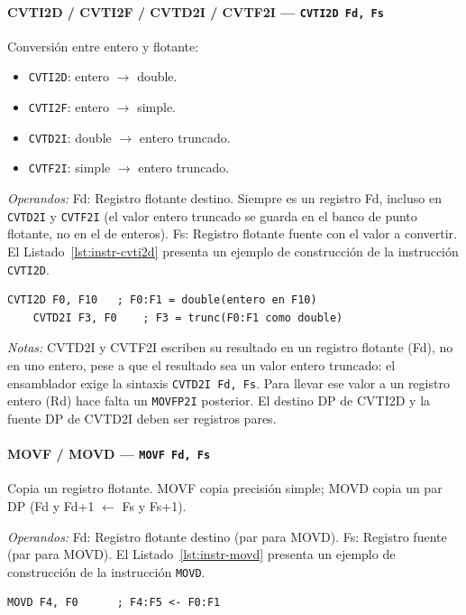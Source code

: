 \documentclass[../main.tex]{subfiles}
\begin{document}
\paragraph*{CVTI2D / CVTI2F / CVTD2I / CVTF2I --- \texttt{CVTI2D Fd, Fs}}
Conversión entre entero y flotante:
\begin{itemize}
	\item \texttt{CVTI2D}: entero $\to$ double.
	\item \texttt{CVTI2F}: entero $\to$ simple.
	\item \texttt{CVTD2I}: double $\to$ entero truncado.
	\item \texttt{CVTF2I}: simple $\to$ entero truncado.
\end{itemize}

\textit{Operandos:} Fd: Registro flotante destino. Siempre es un registro Fd, incluso en \texttt{CVTD2I} y \texttt{CVTF2I} (el valor entero truncado se guarda en el banco de punto flotante, no en el de enteros). Fs: Registro flotante fuente con el valor a convertir.
El Listado~\ref{lst:instr-cvti2d} presenta un ejemplo de construcción de la instrucción \texttt{CVTI2D}.

\begin{lstlisting}[caption={CVTI2D},label={lst:instr-cvti2d}]
	CVTI2D F0, F10   ; F0:F1 = double(entero en F10)
	CVTD2I F3, F0    ; F3 = trunc(F0:F1 como double)
\end{lstlisting}
\textit{Notas:} CVTD2I y CVTF2I escriben su resultado en un registro flotante (Fd), no en uno entero, pese a que el resultado sea un valor entero truncado: el ensamblador exige la sintaxis \texttt{CVTD2I Fd, Fs}. Para llevar ese valor a un registro entero (Rd) hace falta un \texttt{MOVFP2I} posterior. El destino DP de CVTI2D y la fuente DP de CVTD2I deben ser registros pares.

\paragraph*{MOVF / MOVD --- \texttt{MOVF Fd, Fs}}
Copia un registro flotante. MOVF copia precisión simple; MOVD copia un par DP (Fd y Fd+1 $\leftarrow$ Fs y Fs+1).

\textit{Operandos:} Fd: Registro flotante destino (par para MOVD). Fs: Registro fuente (par para MOVD).
El Listado~\ref{lst:instr-movd} presenta un ejemplo de construcción de la instrucción \texttt{MOVD}.

\begin{lstlisting}[caption={MOVD},label={lst:instr-movd}]
	MOVD F4, F0      ; F4:F5 <- F0:F1
\end{lstlisting}
\end{document}
